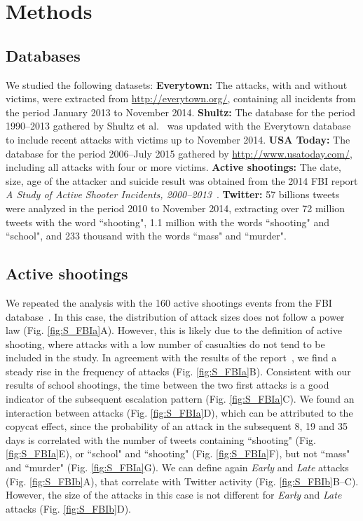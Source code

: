 \section*{Methods}

\subsection*{Databases}
We studied the following datasets:
\textbf{Everytown:} The attacks, with and without victims, were extracted from \url{http://everytown.org/}, containing all incidents from the period January 2013 to November 2014.
\textbf{Shultz:} The database for the period 1990--2013 gathered by Shultz et al.~\cite{Shultz2013} was updated with the Everytown database to include recent attacks with victims up to November 2014.
\textbf{USA Today:} The database for the period 2006--July 2015 gathered by \url{http://www.usatoday.com/},  including all attacks with four or more victims.
\textbf{Active shootings:} The date, size, age of the attacker and suicide result was obtained from the 2014 FBI report \textit{A Study of Active Shooter Incidents, 2000--2013}~\cite{FBI}.
\textbf{Twitter:} 57 billions tweets were analyzed in the period 2010 to November 2014, extracting over 72 million tweets with the word ``shooting", 1.1 million with the words ``shooting" and ``school", and 233 thousand with the words ``mass" and ``murder". 
 
\subsection*{Active shootings}
We repeated the analysis with the 160 active shootings events from the FBI database~\cite{FBI}. 
In this case, the distribution of attack sizes does not follow a power law (Fig. \ref{fig:S_FBIa}A). However, this is likely due to the definition of active shooting, where attacks with a low number of casualties do not tend to be included in the study. In agreement with the results of the report~\cite{FBI}, we find a steady rise in the frequency of attacks (Fig. \ref{fig:S_FBIa}B). 
Consistent with our results of school shootings, the time between the two first attacks is a good indicator of the subsequent escalation pattern (Fig. \ref{fig:S_FBIa}C). 
We found an interaction between attacks (Fig. \ref{fig:S_FBIa}D), which can be attributed to the copycat effect, since the probability of an attack in the subsequent 8, 19 and 35 days is correlated with the number of tweets containing ``shooting" (Fig. \ref{fig:S_FBIa}E), or ``school" and ``shooting" (Fig. \ref{fig:S_FBIa}F), but not ``mass" and ``murder" (Fig. \ref{fig:S_FBIa}G). 
We can define again \textit{Early} and \textit{Late} attacks (Fig. \ref{fig:S_FBIb}A), that correlate with Twitter activity (Fig. \ref{fig:S_FBIb}B--C). 
However, the size of the attacks in this case is not different for \textit{Early} and \textit{Late} attacks (Fig. \ref{fig:S_FBIb}D). 

